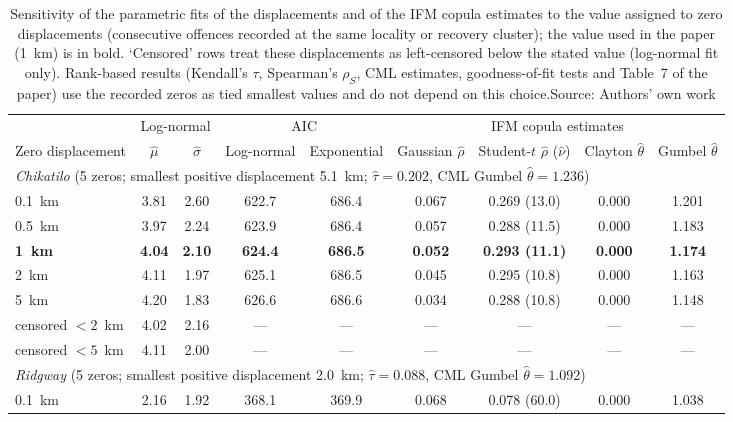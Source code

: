 \documentclass[11pt,a4paper]{article}
\begin{document}
\begin{table}[htbp]
\centering\footnotesize\setlength{\tabcolsep}{4pt}
\caption{Sensitivity of the parametric fits of the displacements and of the IFM copula estimates to the value assigned to zero displacements (consecutive offences recorded at the same locality or recovery cluster); the value used in the paper (1~km) is in bold. `Censored' rows treat these displacements as left-censored below the stated value (log-normal fit only). Rank-based results (Kendall's $\tau$, Spearman's $\rho_S$, CML estimates, goodness-of-fit tests and Table~7 of the paper) use the recorded zeros as tied smallest values and do not depend on this choice.\newline Source: Authors' own work}
\begin{tabular}{lcccccccc}
\toprule
 & \multicolumn{2}{c}{Log-normal} & \multicolumn{2}{c}{AIC} & \multicolumn{4}{c}{IFM copula estimates}\\
\cmidrule(lr){2-3}\cmidrule(lr){4-5}\cmidrule(lr){6-9}
Zero displacement & $\hat\mu$ & $\hat\sigma$ & Log-normal & Exponential & Gaussian $\hat\rho$ & Student-$t$ $\hat\rho$ ($\hat\nu$) & Clayton $\hat\theta$ & Gumbel $\hat\theta$\\
\midrule
\multicolumn{9}{l}{\textit{Chikatilo} (5 zeros; smallest positive displacement 5.1~km; $\hat\tau=0.202$, CML Gumbel $\hat\theta=1.236$)}\\
0.1~km & 3.81 & 2.60 & 622.7 & 686.4 & 0.067 & 0.269 (13.0) & 0.000 & 1.201\\
0.5~km & 3.97 & 2.24 & 623.9 & 686.4 & 0.057 & 0.288 (11.5) & 0.000 & 1.183\\
\textbf{1~km} & \textbf{4.04} & \textbf{2.10} & \textbf{624.4} & \textbf{686.5} & \textbf{0.052} & \textbf{0.293 (11.1)} & \textbf{0.000} & \textbf{1.174}\\
2~km & 4.11 & 1.97 & 625.1 & 686.5 & 0.045 & 0.295 (10.8) & 0.000 & 1.163\\
5~km & 4.20 & 1.83 & 626.6 & 686.6 & 0.034 & 0.288 (10.8) & 0.000 & 1.148\\
censored $<2$~km & 4.02 & 2.16 & --- & --- & --- & --- & --- & ---\\
censored $<5$~km & 4.11 & 2.00 & --- & --- & --- & --- & --- & ---\\
\midrule
\multicolumn{9}{l}{\textit{Ridgway} (5 zeros; smallest positive displacement 2.0~km; $\hat\tau=0.088$, CML Gumbel $\hat\theta=1.092$)}\\
0.1~km & 2.16 & 1.92 & 368.1 & 369.9 & 0.068 & 0.078 (60.0) & 0.000 & 1.038\\

\end{tabular}
\end{table}
\end{document}
